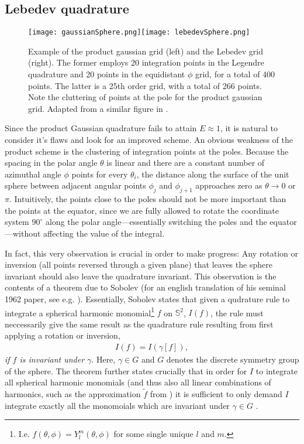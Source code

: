 \documentclass[../../master.tex]{subfiles}
\begin{document}
\subsection{Lebedev quadrature}
\begin{figure}
\centering
\texttt{[image: gaussianSphere.png]}\texttt{[image: lebedevSphere.png]}
\caption{Example of the product gaussian grid (left) and the Lebedev grid (right). The former employs 20 integration points in the Legendre quadrature and 20 points in the equidistant $\phi$ grid, for a total of 400 points. The latter is a 25th order grid, with a total of 266 points. Note the cluttering of points at the pole for the product gaussian grid. Adapted from a similar figure in \cite{beentjes}.\label{fig:dft1}}
\end{figure}
Since the product Gaussian quadrature fails to attain $E\approx1$, it is natural to consider it's flaws and look for an improved scheme. An obvious weakness of the product scheme is the clustering of integration points at the poles. Because the spacing in the polar angle $\theta$ is linear and there are a constant number of azimuthal angle $\phi$ points for every $\theta_i$, the distance along the surface of the unit sphere between adjacent angular points $\phi_j$ and $\phi_{j+1}$ approaches zero as $\theta\rightarrow0$ or $\pi$. Intuitively, the points close to the poles should not be more important than the points at the equator, since we are fully allowed to rotate the coordinate system $90^\circ$ along the polar angle\----essentially switching the poles and the equator\----without affecting the value of the integral.

In fact, this very observation is crucial in order to make progress: Any rotation or inversion (all points reversed through a given plane) that leaves the sphere invariant should also leave the quadrature invariant. This observation is the contents of a theorem due to Sobolev (for an english translation of his seminal 1962 paper, see e.g. \cite{sobolev}). Essentially, Sobolev states that given a qudrature rule to integrate a spherical harmonic monomial\footnote{I.e. $f(\theta,\phi)=Y^m_l(\theta,\phi)$ for some single unique $l$ and $m$.} $f$ on $\mathbb{S}^2$, $I(f)$, the rule must neccessarily give the same result as the quadrature rule resulting from first applying a rotation or inversion,
\begin{align}
I(f)=I(\gamma[f]),
\end{align}
\emph{if $f$ is invariant under $\gamma$}. Here, $\gamma\in G$ and $G$ denotes the discrete symmetry group of the sphere. The theorem further states crucially that in order for $I$ to integrate all spherical harmonic monomials (and thus also all linear combinations of harmonics, such as the approximation $\tilde f$ from ) it is sufficient to only demand $I$ integrate exactly all the monomoials which are invariant under $\gamma\in G$ \cite{atkinson}. 
\end{document}
